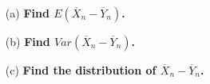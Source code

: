\documentclass{article}
\begin{document}

\begin{itemize}
	\item[(a)] \textbf{Find $E(\overline{X}_n-\overline{Y}_n)$.} \\
	
	\item[(b)] \textbf{Find $Var(\overline{X}_n-\overline{Y}_n)$.} \\
	
	\item[(c)] \textbf{Find the distribution of $\overline{X}_n-\overline{Y}_n$.} \\
	
\end{itemize}	

\end{document}
